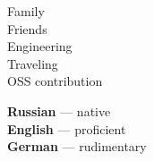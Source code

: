\documentclass[11pt]{developercv} %
\begin{document}
\vspace{1.5cm}
\hfill
\begin{minipage}[t]{0.3\textwidth}
  \vspace{-\baselineskip} %


  Family\\
  Friends\\
  Engineering\\
  Traveling\\
  OSS contribution
\end{minipage}
\hfill
\begin{minipage}[t]{0.3\textwidth}
  \vspace{-\baselineskip} %


  \textbf{Russian} --- native\\
  \textbf{English} --- proficient\\
  \textbf{German} --- rudimentary
\end{minipage}
\hfill

\end{document}
